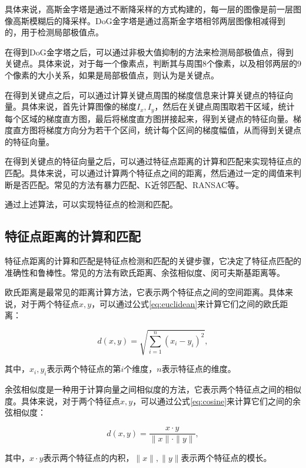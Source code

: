 具体来说，高斯金字塔是通过不断降采样的方式构建的，每一层的图像是前一层图像高斯模糊后的降采样。DoG金字塔是通过高斯金字塔相邻两层图像相减得到的，用于检测局部极值点。

在得到DoG金字塔之后，可以通过非极大值抑制的方法来检测局部极值点，得到关键点。具体来说，对于每一个像素点，判断其与周围8个像素，以及相邻两层的9个像素的大小关系，如果是局部极值点，则认为是关键点。

在得到关键点之后，可以通过计算关键点周围的梯度信息来计算关键点的特征向量。具体来说，首先计算图像的梯度$I_x, I_y$，然后在关键点周围取若干区域，统计每个区域的梯度直方图，最后将梯度直方图拼接起来，得到关键点的特征向量。梯度直方图将梯度方向分为若干个区间，统计每个区间的梯度幅值，从而得到关键点的特征向量。

在得到关键点的特征向量之后，可以通过特征点距离的计算和匹配来实现特征点的匹配。具体来说，可以通过计算两个特征点之间的距离，然后通过一定的阈值来判断是否匹配。常见的方法有暴力匹配、K近邻匹配、RANSAC等。

通过上述算法，可以实现特征点的检测和匹配。

\subsection{特征点距离的计算和匹配}

特征点距离的计算和匹配是特征点检测和匹配的关键步骤，它决定了特征点匹配的准确性和鲁棒性。常见的方法有欧氏距离、余弦相似度、闵可夫斯基距离等。

欧氏距离是最常见的距离计算方法，它表示两个特征点之间的空间距离。具体来说，对于两个特征点$x, y$，可以通过公式\ref{eq:euclidean}来计算它们之间的欧氏距离：

\begin{equation}
    d(x, y) = \sqrt{\sum_{i=1}^{n} (x_i - y_i)^2},
    \label{eq:euclidean}
\end{equation}

其中，$x_i, y_i$表示两个特征点的第$i$个维度，$n$表示特征点的维度。

余弦相似度是一种用于计算向量之间相似度的方法，它表示两个特征点之间的相似度。具体来说，对于两个特征点$x, y$，可以通过公式\ref{eq:cosine}来计算它们之间的余弦相似度：

\begin{equation}
    d(x, y) = \frac{x \cdot y}{\|x\| \cdot \|y\|},
    \label{eq:cosine}
\end{equation}

其中，$x \cdot y$表示两个特征点的内积，$\|x\|, \|y\|$表示两个特征点的模长。

